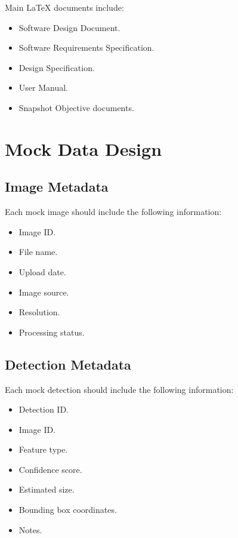 \documentclass[12pt]{article}
\begin{document}
Main LaTeX documents include:

\begin{itemize}
    \item Software Design Document.
    \item Software Requirements Specification.
    \item Design Specification.
    \item User Manual.
    \item Snapshot Objective documents.
\end{itemize}

\section{Mock Data Design}

\subsection{Image Metadata}

Each mock image should include the following information:

\begin{itemize}
    \item Image ID.
    \item File name.
    \item Upload date.
    \item Image source.
    \item Resolution.
    \item Processing status.
\end{itemize}

\subsection{Detection Metadata}

Each mock detection should include the following information:

\begin{itemize}
    \item Detection ID.
    \item Image ID.
    \item Feature type.
    \item Confidence score.
    \item Estimated size.
    \item Bounding box coordinates.
    \item Notes.
\end{itemize}
\end{document}
